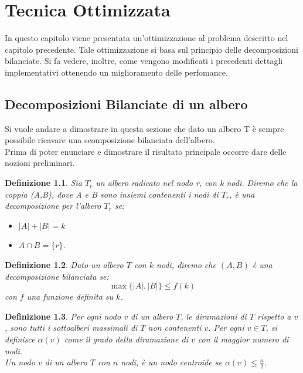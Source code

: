 \chapter{Tecnica Ottimizzata}
\label{cap:3}
In questo capitolo viene presentata un'ottimizzazione al problema descritto nel capitolo precedente.
Tale ottimizzazione si basa sul principio delle decomposizioni bilanciate.
Si fa vedere, inoltre, come vengono modificati i precedenti dettagli implementativi ottenendo un miglioramento delle perfomance.

\section{Decomposizioni Bilanciate di un albero}
\label{cap:3 par:1}
Si vuole andare a dimostrare in questa sezione che dato un albero T \`e sempre possibile ricavare una scomposizione bilanciata dell'albero.
\\
Prima di poter enunciare e dimostrare il risultato principale occorre dare delle nozioni preliminari.

\newtheorem{definizione}{Definizione}[section]

\begin{definizione}
	\label{definizioneDeco}
Sia $T_r$ un albero radicato nel nodo r, con k nodi.
Diremo che la coppia (A,B), dove  A e B sono insiemi contenenti i nodi di $T_r$, \`e una decomposizione per l'albero $ T_r $ se:
\begin{itemize}
	\item $| A | + | B | = k$
	\item $A \cap B = \{r\}$.
\end{itemize}
\end{definizione}


\begin{definizione}
\label{lemmaDeco}
Dato un albero $ T $ con $ k $ nodi, diremo che $ (A,B) $ \`e una decomposizione bilanciata se:
\begin{equation*}
	\max{ \{|A| , |B| \} }  \le  f(k)
\end{equation*}
con $ f $ una funzione definita su $ k $.
\end{definizione}





\begin{definizione}
Per ogni nodo $ v $ di un albero $ T $, le diramazioni di $ T $  rispetto a $ v $, sono tutti i sottoalberi massimali di $ T $ non contenenti $ v $. 
Per ogni $ v \in T $, si definisce $\alpha(v)$ come il grado della diramazione di $ v $ con il maggior numero di nodi.\\
Un nodo $ v $ di un albero $ T $ con $ n $ nodi, \`e un nodo centroide se $\alpha(v)\le\frac{n}{2}$.
\end{definizione}\mbox{}

